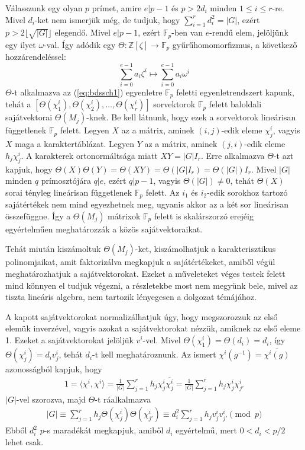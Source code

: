 Válasszunk egy olyan $p$ prímet, amire $e|p-1$ és $p > 2 d_i$ minden $1\le i\le r$-re. Mivel $d_i$-ket nem ismerjük még, de tudjuk, hogy 
$\sum_{i=1}^r d_i^2 = |G|$, ezért $p > 2\lfloor \sqrt{|G|} \rfloor$ elegendő. Mivel $e|p-1$, ezért $\mathbb{F}_p$-ben van $e$-rendű elem, jelöljünk
egy ilyet $\omega$-val. Így adódik egy $\Theta : \mathbb{Z}[\zeta] \to \mathbb{F}_p$ gyűrűhomomorfizmus, a következő hozzárendeléssel:
$$\sum_{i=0}^{e-1} a_i \zeta^i \mapsto \sum_{i=0}^{e-1} a_i \omega^i$$
$\Theta$-t alkalmazva az (\ref{eq:bdssch1}) egyenletre $\mathbb{F}_p$ feletti egyenletrendszert kapunk,
tehát a $[\Theta(\chi^i_1), \Theta(\chi^i_2), \dots, \Theta(\chi^i_r)]$ sorvektorok $\mathbb{F}_p$ felett baloldali sajátvektorai $\Theta(M_j)$-knek.
Be kell látnunk, hogy ezek a sorvektorok lineárisan függetlenek $\mathbb{F}_p$ felett.
Legyen $X$ az a mátrix, aminek $(i, j)$-edik eleme $\chi^i_j$, vagyis $X$ maga a karaktertáblázat.
Legyen $Y$ az a mátrix, aminek $(j, i)$-edik eleme $h_j\chi^i_j$.
A karakterek ortonormáltsága miatt $XY=|G|I_r$.
Erre alkalmazva $\Theta$-t azt kapjuk, hogy $\Theta(X)\Theta(Y)=\Theta(XY)=\Theta(|G|I_r)=\Theta(|G|)I_r$.
Mivel $|G|$ minden $q$ prímosztójára $q|e$, ezért $q|p-1$, vagyis $\Theta(|G|)\ne 0$, tehát $\Theta(X)$ sorai tényleg lineárisan függetlenek $\mathbb{F}_p$ felett.
Az $i_1$ és $i_2$-edik sorokhoz tartozó sajátértékek nem mind egyezhetnek meg, ugyanis akkor az a két sor lineárisan összefüggne.
Így a $\Theta(M_j)$ mátrixok $\mathbb{F}_p$ felett is skalárszorzó erejéig egyértelműen meghatározzák a közös sajátvektoraikat.

Tehát miután kiszámoltuk $\Theta(M_j)$-ket, kiszámolhatjuk a karakterisztikus polinomjaikat, amit faktorizálva megkapjuk a sajátértékeket, amiből végül meghatározhatjuk a sajátvektorokat.
Ezeket a műveleteket véges testek felett mind könnyen el tudjuk végezni, a részletekbe most nem megyünk bele, mivel az tiszta lineáris algebra, nem tartozik lényegesen a dolgozat témájához.

A kapott sajátvektorokat normalizálhatjuk úgy, hogy megszorozzuk az első elemük inverzével, vagyis azokat a sajátvektorokat nézzük, amiknek az első eleme 1.
Ezeket a sajátvektorokat jelöljük $v^i$-vel. Mivel $\Theta(\chi^i_1)=\Theta(d_i)=d_i$, így $\Theta(\chi^i_j)=d_i v^i_j$, tehát $d_i$-t kell meghatároznunk.
Az ismert $\chi^i(g^{-1})=\overline{\chi^i(g)}$ azonosságból kapjuk, hogy
\begin{align}
\label{eq:bdssch2}
1 = \langle \chi^i, \chi^i \rangle = \frac{1}{|G|}\sum_{j=1}^r h_j \chi^i_j \overline{\chi^i_j} = \frac{1}{|G|}\sum_{j=1}^r h_j \chi^i_j \chi^i_{j'}
\end{align}
$|G|$-vel szorozva, majd $\Theta$-t ráalkalmazva
\begin{align}
\label{eq:bdssch2}
|G| \equiv \sum_{j=1}^r h_j \Theta(\chi^i_j) \Theta(\chi^i_{j'}) \equiv d_i^2 \sum_{j=1}^r h_j v^i_j v^i_{j'} \pmod{p}
\end{align}
Ebből $d_i^2$ $p$-s maradékát megkapjuk, amiből $d_i$ egyértelmű, mert $0<d_i<p/2$ lehet csak.

